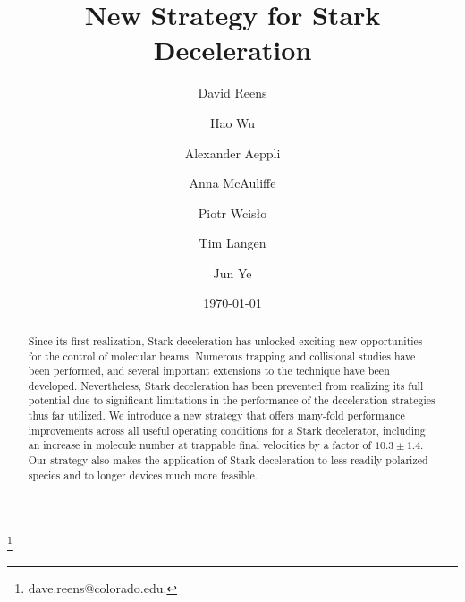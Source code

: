 \documentclass[%
 reprint,
 amsmath,amssymb,
 aps,
prl,
]{revtex4-1}
\begin{document}
\title{New Strategy for Stark Deceleration}%

\author{David Reens}
\thanks{dave.reens@colorado.edu.}

\author{Hao Wu}
\author{Alexander Aeppli}
\author{Anna McAuliffe}
\author{Piotr Wcis\l o}
\author{Tim Langen}%

\author{Jun Ye}


\date{\today}



\begin{abstract}
Since its first realization, Stark deceleration has unlocked exciting new opportunities for the control of molecular beams. 
Numerous trapping and collisional studies have been performed, and several important extensions to the technique have been developed. 
Nevertheless, Stark deceleration has been prevented from realizing its full potential due to significant limitations in the performance of the deceleration strategies thus far utilized.
We introduce a new strategy that offers many-fold performance improvements across all useful operating conditions for a Stark decelerator, including an increase in molecule number at trappable final velocities by a factor of $10.3\pm1.4$.
Our strategy also makes the application of Stark deceleration to less readily polarized species and to longer devices much more feasible.
\end{abstract}

\maketitle
\end{document}
